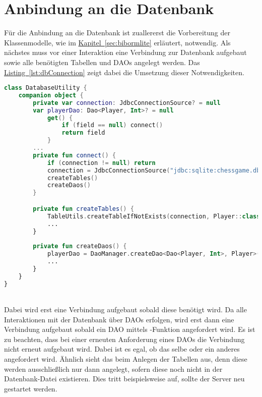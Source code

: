 \section{Anbindung an die Datenbank}
Für die Anbindung an die Datenbank ist zuallererst die Vorbereitung der Klassenmodelle, wie im \hyperref[sec:bibormlite]{Kapitel~\ref{sec:bibormlite}} erläutert, notwendig.
Als nächstes muss vor einer Interaktion eine Verbindung zur Datenbank aufgebaut sowie alle benötigten Tabellen und \glspl{DAO} angelegt werden. Das \hyperref[lst:dbConnection]{Listing~\ref{lst:dbConnection}} zeigt dabei die Umsetzung  dieser Notwendigkeiten.
\\
\begin{lstlisting}[style=lstStyleFramed, language=Kotlin, caption={Verbindungsaufbau \& Initialisierung der SQLite Datenbank}, label=lst:dbConnection, float]
class DatabaseUtility {
	companion object {
		private var connection: JdbcConnectionSource? = null
		var playerDao: Dao<Player, Int>? = null
			get() {
				if (field == null) connect()
				return field
			}
		...
		private fun connect() {
			if (connection != null) return
			connection = JdbcConnectionSource("jdbc:sqlite:chessgame.db")
			createTables()
			createDaos()
		}

		private fun createTables() {
			TableUtils.createTableIfNotExists(connection, Player::class.java)
			...
		}
		
		private fun createDaos() {
			playerDao = DaoManager.createDao<Dao<Player, Int>, Player>(connection, Player::class.java)
			...
		}
	}
}
\end{lstlisting}
\\
Dabei wird erst eine Verbindung aufgebaut sobald diese benötigt wird. Da alle Interaktionen mit der Datenbank über \glspl{DAO} erfolgen, wird erst dann eine Verbindung aufgebaut sobald ein \gls{DAO} mittels -Funktion angefordert wird. Es ist zu beachten, dass bei einer erneuten Anforderung eines \glspl{DAO} die Verbindung nicht erneut aufgebaut wird. Dabei ist es egal, ob das selbe oder ein anderes angefordert wird. Ähnlich sieht das beim Anlegen der Tabellen aus, denn diese werden ausschließlich nur dann angelegt, sofern diese noch nicht in der Datenbank-Datei existieren. Dies tritt beispielsweise auf, sollte der Server neu gestartet werden.

